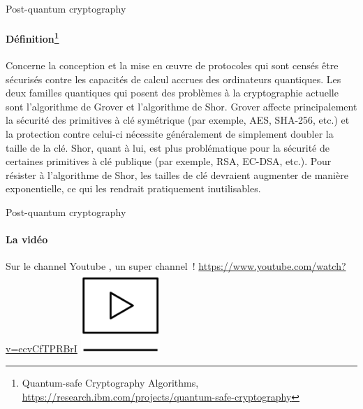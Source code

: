\documentclass{beamer}
\begin{document}
    \begin{frame}{Post-quantum cryptography}
        \begin{small}
            \framesubtitle{Définition\footnote{Quantum-safe Cryptography Algorithms, \url{https://research.ibm.com/projects/quantum-safe-cryptography}}}
            \transdissolve
            Concerne la conception et la mise en œuvre de protocoles qui sont censés être sécurisés contre les capacités de calcul accrues des ordinateurs quantiques.
            Les deux familles quantiques qui posent des problèmes à la cryptographie actuelle sont l'algorithme de Grover et l'algorithme de Shor.
            \bigbreak
            Grover affecte principalement la sécurité des primitives à clé symétrique (par exemple, AES, SHA-256, etc.) et la protection contre celui-ci nécessite généralement de simplement doubler la taille de la clé.
            \bigbreak
            Shor, quant à lui, est plus problématique pour la sécurité de certaines primitives à clé publique (par exemple, RSA, EC-DSA, etc.).
            Pour résister à l'algorithme de Shor, les tailles de clé devraient augmenter de manière exponentielle, ce qui les rendrait pratiquement inutilisables.
        \end{small}
    \end{frame}

    \begin{frame}{Post-quantum cryptography}
        \framesubtitle{La vidéo}
        \transdissolve
        Sur le channel Youtube , un super channel~! \url{https://www.youtube.com/watch?v=ecvCfTPRBrI}
        \bigbreak
        \centering
        \includegraphics[width=3cm]{image/video}
    \end{frame}
\end{document}
